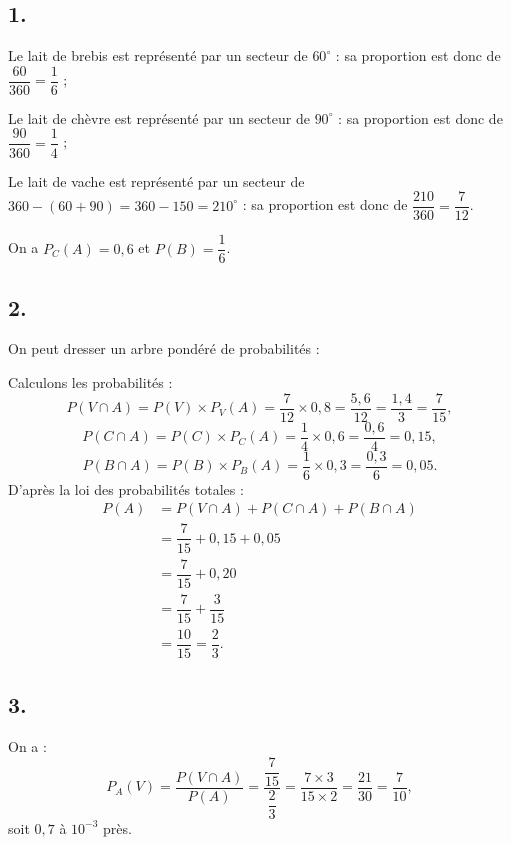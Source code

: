 \subsection*{1.}

Le lait de brebis est représenté par un secteur de \(60^\circ\) : sa proportion est donc de \(\dfrac{60}{360} = \dfrac{1}{6}\) ;

Le lait de chèvre est représenté par un secteur de \(90^\circ\) : sa proportion est donc de \(\dfrac{90}{360} = \dfrac{1}{4}\) ;

Le lait de vache est représenté par un secteur de \(360 - (60 + 90) = 360 - 150 = 210^\circ\) : sa proportion est donc de \(\dfrac{210}{360} = \dfrac{7}{12}\).

On a \( P_C(A) = 0{,}6 \) et \( P(B) = \dfrac{1}{6} \).


\subsection*{2.}

On peut dresser un arbre pondéré de probabilités :

\begin{center}
\end{center}

Calculons les probabilités :
\[
P(V \cap A) = P(V) \times P_V(A) = \dfrac{7}{12} \times 0{,}8 = \dfrac{5{,}6}{12} = \dfrac{1{,}4}{3} = \dfrac{7}{15},
\]
\[
P(C \cap A) = P(C) \times P_C(A) = \dfrac{1}{4} \times 0{,}6 = \dfrac{0{,}6}{4} = 0{,}15,
\]
\[
P(B \cap A) = P(B) \times P_B(A) = \dfrac{1}{6} \times 0{,}3 = \dfrac{0{,}3}{6} = 0{,}05.
\]
D'après la loi des probabilités totales :
\begin{align*}
P(A) &= P(V \cap A) + P(C \cap A) + P(B \cap A) \\
&= \dfrac{7}{15} + 0{,}15 + 0{,}05 \\
&= \dfrac{7}{15} + 0{,}20 \\
&= \dfrac{7}{15} + \dfrac{3}{15} \\
&= \dfrac{10}{15} = \dfrac{2}{3}.
\end{align*}

\subsection*{3.}

On a :
\[
P_A(V) = \frac{P(V \cap A)}{P(A)} = \frac{\dfrac{7}{15}}{\dfrac{2}{3}} = \frac{7 \times 3}{15 \times 2} = \frac{21}{30} = \dfrac{7}{10},
\]
soit \(0{,}7\) à \(10^{-3}\) près.
